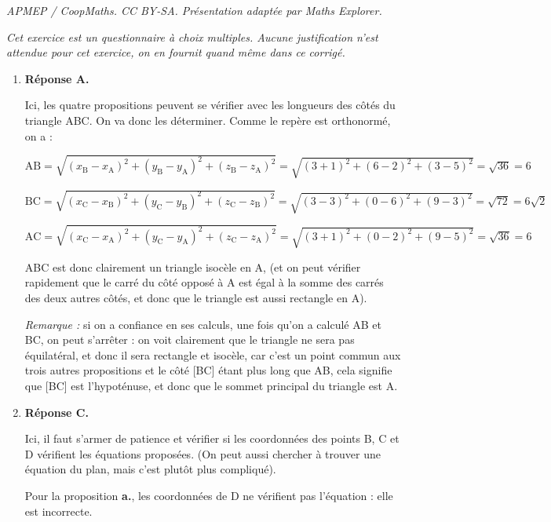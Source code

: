 \documentclass[10pt]{article}
\begin{document}
\noindent\textit{APMEP / CoopMaths. CC BY-SA. Présentation adaptée par Maths Explorer.}\par\medskip
\medskip

\emph{Cet exercice est un questionnaire à choix multiples. Aucune justification n'est attendue pour cet exercice, on en fournit quand même dans ce corrigé.}

\medskip

\begin{enumerate}
	\item \textbf{Réponse A.}

Ici, les quatre propositions peuvent se vérifier avec les longueurs des côtés du triangle ABC. On va donc les déterminer. Comme le repère est orthonormé, on a :

$\mathrm{AB} = \sqrt{(x_\mathrm{B} - x_\mathrm{A})^2+(y_\mathrm{B} - y_\mathrm{A})^2+(z_\mathrm{B} - z_\mathrm{A})^2} = \sqrt{(3 + 1)^2 + (6-2)^2 + (3 - 5)^2} = \sqrt{36}=6$

$\mathrm{BC} = \sqrt{(x_\mathrm{C} - x_\mathrm{B})^2+(y_\mathrm{C} - y_\mathrm{B})^2+(z_\mathrm{C} - z_\mathrm{B})^2} = \sqrt{(3-3)^2 + (0-6)^2 + (9-3)^2} = \sqrt{72}=6\sqrt{2}$

$\mathrm{AC} = \sqrt{(x_\mathrm{C} - x_\mathrm{A})^2+(y_\mathrm{C} - y_\mathrm{A})^2+(z_\mathrm{C} - z_\mathrm{A})^2} = \sqrt{(3 + 1)^2 + (0-2)^2 + (9 - 5)^2} = \sqrt{36}=6$

ABC est donc clairement un triangle isocèle en A, (et on peut vérifier rapidement que le carré du côté opposé à A est égal à la somme des carrés des deux autres côtés, et donc que le triangle est aussi rectangle en A).

\emph{Remarque :} si on a confiance en ses calculs, une fois qu'on a calculé AB et BC, on peut s'arrêter : on voit clairement que le triangle ne sera pas équilatéral, et donc il sera rectangle et isocèle, car c'est un point commun aux trois autres propositions et le côté [BC] étant plus long que AB, cela signifie que [BC] est l'hypoténuse, et donc que le sommet principal du triangle est A.

	\item \textbf{Réponse C.}

Ici, il faut s'armer de patience et vérifier si les coordonnées des points B, C et D vérifient les équations proposées. (On peut aussi chercher à trouver une équation du plan, mais c'est plutôt plus compliqué).

Pour la proposition \textbf{a.}, les coordonnées de D ne vérifient pas l'équation : elle est incorrecte.


\end{enumerate}
\end{document}

